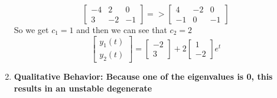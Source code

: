 \documentclass[12pt]{article}
\begin{document}
\begin{enumerate}[label = (\alph*)]
$$\begin{bmatrix}
				-4 & 2 & 0 \\
				3 & -2 & -1
			\end{bmatrix}
			=>
			\begin{bmatrix}
				4 & -2 & 0 \\
				-1 & 0 & -1
			\end{bmatrix}
			$$
			So we get \boldmath $c_1 = 1$ and then we can see that $c_2 = 2$ 
				$$
				\begin{bmatrix}
				y_1(t) \\ y_2(t)
				\end{bmatrix}
				= 
				\begin{bmatrix}
				-2 \\ 3
				\end{bmatrix} + 
				2
				\begin{bmatrix}
				1 \\ -2
				\end{bmatrix}e^{t}
				$$
				\unboldmath
			\item \textbf{Qualitative Behavior: Because one of the eigenvalues is 0, this results in an unstable degenerate}
	\end{enumerate}

\newpage
\end{document}
